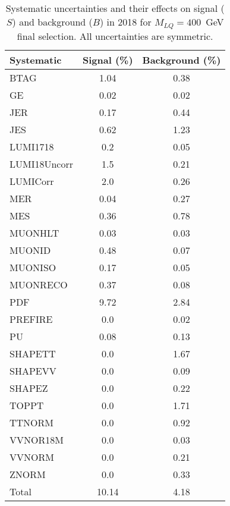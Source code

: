 \begin{table}[htbp]
\begin{center}
\caption{Systematic uncertainties and their effects on signal ($S$) and background ($B$) in 2018 for $M_{LQ}=400$~GeV final selection. All uncertainties are symmetric.}
\begin{tabular}{lcc}
\hline\hline
Systematic & Signal (\%) & Background (\%) \\ \hline 
BTAG & 1.04 & 0.38\\ 
GE & 0.02 & 0.02\\ 
JER & 0.17 & 0.44\\ 
JES & 0.62 & 1.23\\ 
LUMI1718 & 0.2 & 0.05\\ 
LUMI18Uncorr & 1.5 & 0.21\\ 
LUMICorr & 2.0 & 0.26\\ 
MER & 0.04 & 0.27\\ 
MES & 0.36 & 0.78\\ 
MUONHLT & 0.03 & 0.03\\ 
MUONID & 0.48 & 0.07\\ 
MUONISO & 0.17 & 0.05\\ 
MUONRECO & 0.37 & 0.08\\ 
PDF & 9.72 & 2.84\\ 
PREFIRE & 0.0 & 0.02\\ 
PU & 0.08 & 0.13\\ 
SHAPETT & 0.0 & 1.67\\ 
SHAPEVV & 0.0 & 0.09\\ 
SHAPEZ & 0.0 & 0.22\\ 
TOPPT & 0.0 & 1.71\\ 
TTNORM & 0.0 & 0.92\\ 
VVNOR18M & 0.0 & 0.03\\ 
VVNORM & 0.0 & 0.21\\ 
ZNORM & 0.0 & 0.33\\ 
Total & 10.14 & 4.18\\ \hline \hline
\end{tabular}
\label{tab:SysUncertainties_uujj_400}
\end{center}
\end{table}

